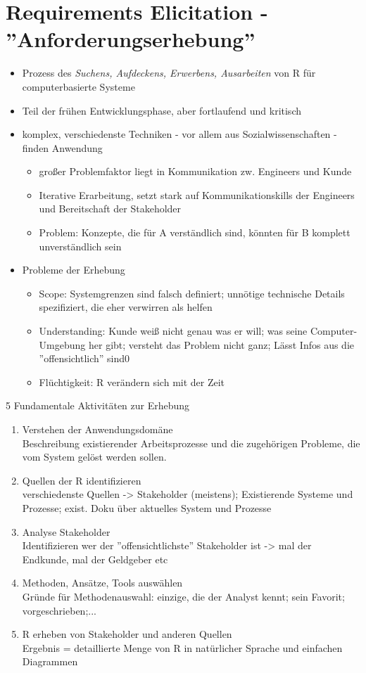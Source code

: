 \section{Requirements Elicitation - ''Anforderungserhebung''}
\begin{itemize}
	\item Prozess des \textit{Suchens, Aufdeckens, Erwerbens, Ausarbeiten} von R für computerbasierte Systeme
	\item Teil der frühen Entwicklungsphase, aber fortlaufend und kritisch
	\item komplex, verschiedenste Techniken - vor allem aus Sozialwissenschaften - finden Anwendung
	\begin{itemize}
		\item großer Problemfaktor liegt in Kommunikation zw. Engineers und Kunde
		\item Iterative Erarbeitung, setzt stark auf Kommunikationskills der Engineers und Bereitschaft der Stakeholder
		\item Problem: Konzepte, die für A verständlich sind, könnten für B komplett unverständlich sein
	\end{itemize}
	\item Probleme der Erhebung
	\begin{itemize}
		\item Scope: Systemgrenzen sind falsch definiert; unnötige technische Details spezifiziert, die eher verwirren als helfen
		\item Understanding: Kunde weiß nicht genau was er will; was seine Computer-Umgebung her gibt; versteht das Problem nicht ganz; Lässt Infos aus die ''offensichtlich'' sind0
		\item Flüchtigkeit: R verändern sich mit der Zeit
	\end{itemize}
\end{itemize}
5 Fundamentale Aktivitäten zur Erhebung
\begin{enumerate}
	\item Verstehen der Anwendungsdomäne\\
	Beschreibung existierender Arbeitsprozesse und die zugehörigen Probleme, die vom System gelöst werden sollen.
	\item Quellen der R identifizieren\\
	verschiedenste Quellen -> Stakeholder (meistens); Existierende Systeme und Prozesse; exist. Doku über aktuelles System und Prozesse
	\item Analyse Stakeholder\\
	Identifizieren wer der ''offensichtlichste'' Stakeholder ist -> mal der Endkunde, mal der Geldgeber etc
	\item Methoden, Ansätze, Tools auswählen\\
	Gründe für Methodenauswahl: einzige, die der Analyst kennt; sein Favorit; vorgeschrieben;...
	\item R erheben von Stakeholder und anderen Quellen\\
	Ergebnis = detaillierte Menge von R in natürlicher Sprache und einfachen Diagrammen
\end{enumerate}
